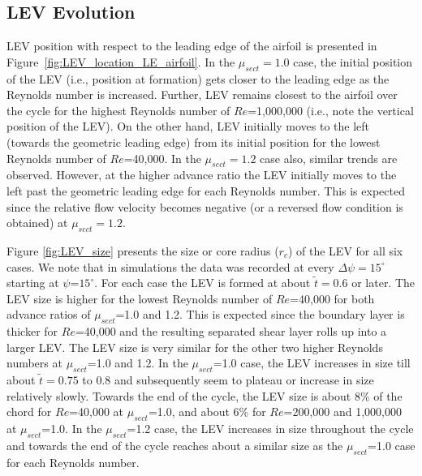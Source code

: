 \subsection{LEV Evolution}
\label{sec:LEV}


LEV position with respect to the leading edge of the airfoil is presented in Figure~\ref{fig:LEV_location_LE_airfoil}.
In the $\mu_{sect}=1.0$ case, the initial position of the LEV (i.e., position at formation) gets closer to the leading edge as the Reynolds number is increased.
Further, LEV remains closest to the airfoil over the cycle for the highest Reynolds number of $Re$=1,000,000 (i.e., note the vertical position of the LEV).
On the other hand, LEV initially moves to the left (towards the geometric leading edge) from its initial position for the lowest Reynolds number of $Re$=40,000.
In the $\mu_{sect}=1.2$ case also, similar trends are observed.
However, at the higher advance ratio the LEV initially moves to the left past the geometric leading edge for each Reynolds number.
This is expected since the relative flow velocity becomes negative (or a reversed flow condition is obtained) at $\mu_{sect}=1.2$.

Figure \ref{fig:LEV_size} presents the size or core radius ($r_c$) of the LEV for all six cases.
We note that in simulations the data was recorded at every $\Delta \psi = 15^\circ$ starting at $\psi$=$15^\circ$.
For each case the LEV is formed at about $\tilde{t}=0.6$ or later.
The LEV size is higher for the lowest Reynolds number of $Re$=40,000 for both advance ratios of $\mu_{sect}$=1.0 and 1.2.
This is expected since the boundary layer is thicker for $Re$=40,000 and the resulting separated shear layer rolls up into a larger LEV.
The LEV size is very similar for the other two higher Reynolds numbers at $\mu_{sect}$=1.0 and 1.2.
In the $\mu_{sect}$=1.0 case, the LEV increases in size till about $\tilde{t}=0.75$ to 0.8 and subsequently seem to plateau or increase in size relatively slowly.
Towards the end of the cycle, the LEV size is about 8\% of the chord for $Re$=40,000 at $\mu_{sect}$=1.0, and about 6\% for $Re$=200,000 and 1,000,000 at $\mu_{sect}$=1.0.
In the $\mu_{sect}$=1.2 case, the LEV increases in size throughout the cycle and towards the end of the cycle reaches about a similar size as the $\mu_{sect}$=1.0 case for each Reynolds number.

